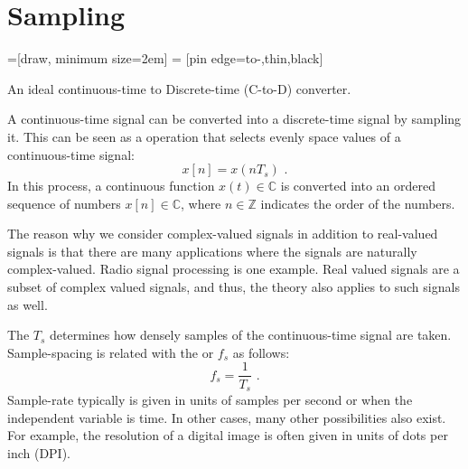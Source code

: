 \section{Sampling}
\begin{marginfigure}
  =[draw, minimum size=2em]
   = [pin edge={to-,thin,black}]
  \begin{center}
  \end{center}
  \caption{An ideal continuous-time to Discrete-time (C-to-D) converter.}
\end{marginfigure}

A continuous-time signal can be converted into a discrete-time signal
by sampling it. This can be seen as a operation that selects evenly
space values of a continuous-time signal:
\begin{equation}
  \boxed{
    x[n] = x(n T_s)
  }\,\,.
\end{equation}
In this process, a continuous function $x(t) \in \mathbb{C}$ is
converted into an ordered sequence of numbers $x[n] \in \mathbb{C}$,
where $n\in\mathbb{Z}$ indicates the order of the numbers.

The reason why we consider complex-valued signals in addition to
real-valued signals is that there are many applications where the
signals are naturally complex-valued.  Radio signal processing is one
example. Real valued signals are a subset of complex valued signals,
and thus, the theory also applies to such signals as well.

The  $T_s$ determines how
densely samples of the continuous-time signal are
taken. Sample-spacing is related with the
 or
 $f_s$ as follows:
\begin{equation}
  \boxed{
    f_s = \frac{1}{T_s}
  }\,\,.
\end{equation}
Sample-rate typically is given in units of samples per second or
\emph{} when the independent variable is time. In
other cases, many other possibilities also exist. For example, the
resolution of a digital image is often given in units of dots per inch
(DPI).

